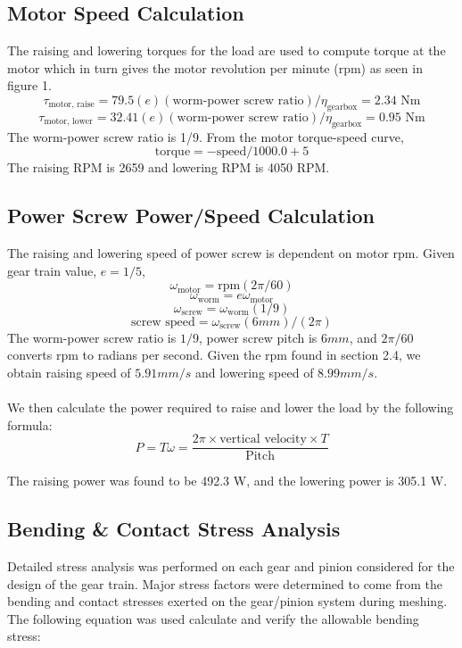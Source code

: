 \documentclass[letterpaper,12pt]{article}
\begin{document}
\subsection{Motor Speed Calculation}
The raising and lowering torques for the load are used to compute torque at the motor which in turn gives the motor revolution per minute (rpm) as seen in figure 1. 
$$\tau_{\text{motor, raise}} = 79.5 (e)(\text{worm-power screw ratio}) / \eta_{\text{gearbox}} = 2.34 \text{ Nm}$$
$$\tau_{\text{motor, lower}} = 32.41 (e)(\text{worm-power screw ratio}) / \eta_{\text{gearbox}} = 0.95 \text{ Nm}$$
The worm-power screw ratio is 1/9. From the motor torque-speed curve, $$\text{torque} = -\text{speed}/1000.0+5$$ The raising RPM is 2659 and lowering RPM is 4050 RPM. 

\subsection{Power Screw Power/Speed Calculation}
The raising and lowering speed of power screw is dependent on motor rpm. Given gear train value, $e = 1/5$, 
$$\omega_{\text{motor}} = \text{rpm} (2\pi/60)$$
$$\omega_{\text{worm}} = e \omega_{\text{motor}}$$
$$\omega_{\text{screw}} = \omega_{\text{worm}} (1/9)$$
$$\text{screw speed} = \omega_{\text{screw}}(6mm)/ (2 \pi)$$
The worm-power screw ratio is $1/9$, power screw pitch is $6mm$, and $2\pi/60$ converts rpm to radians per second. Given the rpm found in section 2.4, we obtain raising speed of $5.91 mm/s$ and lowering speed of $8.99 mm/s$. \\\\
We then calculate the power required to raise and lower the load by the following formula:
\begin{equation}
    P = T \omega = \dfrac{2\pi \times \text{vertical velocity} \times T}{\text{Pitch}}
\end{equation}

\noindent The raising power was found to be 492.3 W, and the lowering power is 305.1 W.
\subsection{Bending \& Contact Stress Analysis}

Detailed stress analysis was performed on each gear and pinion considered for the design of the gear train. Major stress factors were determined to come from the bending and contact stresses exerted on the gear/pinion system during meshing. The following equation was used calculate and verify the allowable bending stress:
\end{document}
